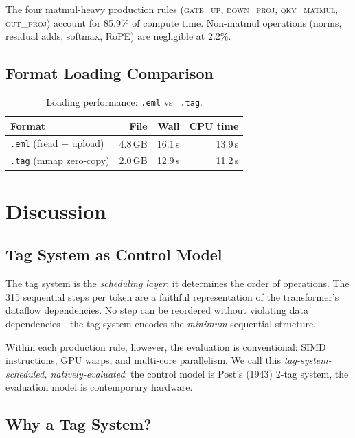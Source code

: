 \documentclass[acmsmall,nonacm]{acmart}
\begin{document}
The four matmul-heavy production rules (\textsc{gate\_up},
\textsc{down\_proj}, \textsc{qkv\_matmul}, \textsc{out\_proj})
account for 85.9\% of compute time.  Non-matmul operations
(norms, residual adds, softmax, RoPE) are negligible at 2.2\%.

\subsection{Format Loading Comparison}

\begin{table}[h]
\centering
\caption{Loading performance: \texttt{.eml} vs.\ \texttt{.tag}.}
\label{tab:loading}
\begin{tabular}{lrrr}
\toprule
\textbf{Format} & \textbf{File} & \textbf{Wall} & \textbf{CPU time} \\
\midrule
\texttt{.eml} (fread + upload) & 4.8\,GB & 16.1\,s & 13.9\,s \\
\texttt{.tag} (mmap zero-copy) & 2.0\,GB & 12.9\,s & 11.2\,s \\
\bottomrule
\end{tabular}
\end{table}


\section{Discussion}
\label{sec:discussion}

\subsection{Tag System as Control Model}

The tag system is the \emph{scheduling layer}: it determines the
order of operations.  The 315 sequential steps per token are a
faithful representation of the transformer's dataflow dependencies.
No step can be reordered without violating data dependencies---the
tag system encodes the \emph{minimum} sequential structure.

Within each production rule, however, the evaluation is conventional:
SIMD instructions, GPU warps, and multi-core parallelism.  We call
this \emph{tag-system-scheduled, natively-evaluated}: the control
model is Post's (1943) 2-tag system, the evaluation model is
contemporary hardware.

\subsection{Why a Tag System?}
\end{document}
